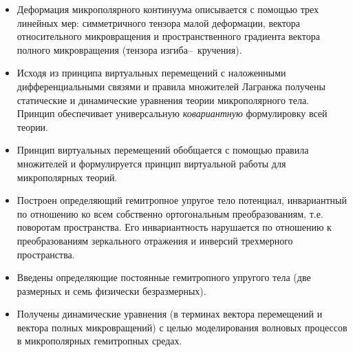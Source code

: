 \begin{itemize}

%

\item[1.]  Деформация микрополярного континуума описывается с помощью трех линейных мер: симметричного тензора малой деформации, вектора относительного микровращения и пространственного градиента вектора полного микровращения (тензора изгиба\cdash--~кручения).

%

\item[2.] Исходя из принципа виртуальных перемещений с наложенными дифференциальными связями и правила множителей Лагранжа получены статические и динамические уравнения теории микрополярного тела. Принцип обеспечивает универсальную \emph{ковариантную} формулировку всей теории.

%

\item[3.] Принцип виртуальных перемещений обобщается с помощью правила множителей и формулируется принцип виртуальной работы для микрополярных теорий.

%

\item[4.] Построен определяющий гемитропное упругое тело потенциал, инвариантный по отношению ко всем собственно ортогональным преобразованиям, т.е. поворотам пространства. Его инвариантность нарушается по отношению к преобразованиям зеркального отражения и инверсий трехмерного пространства.

%

\item[5.] Введены определяющие постоянные гемитропного упругого тела  (две размерных и семь физически безразмерных).

%

\item[6.] Получены динамические уравнения (в терминах вектора перемещений и вектора полных микровращений) с целью моделирования волновых процессов в микрополярных гемитропных средах.

%

\end{itemize}









